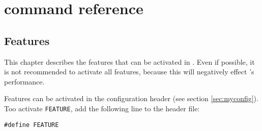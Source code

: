 \chapter{\es{} command reference}
\label{chap:ref}

\section{Features}
\label{sec:features}

\newcommand{\feature}[1]{\texttt{\textbf{#1}}}

This chapter describes the features that can be activated in \es. Even
if possible, it is not recommended to activate all features, because
this will negatively effect \es's performance.

Features can be activated in the configuration header (see section
\vref{sec:myconfig}). Too activate \texttt{FEATURE}, add the following
line to the header file:
\begin{verbatim}
#define FEATURE
\end{verbatim}

